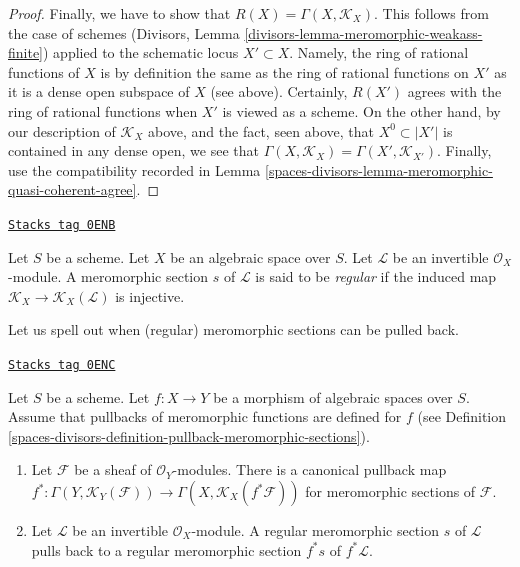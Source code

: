 \begin{proof}
\medskip\noindent
Finally, we have to show that $R(X) = \Gamma(X, \mathcal{K}_X)$.
This follows from the case of schemes
(Divisors, Lemma \ref{divisors-lemma-meromorphic-weakass-finite})
applied to the schematic locus $X' \subset X$.
Namely, the ring of rational functions of $X$ is by definition
the same as the ring of rational functions on $X'$
as it is a dense open subspace of $X$ (see above).
Certainly, $R(X')$ agrees with the ring of rational functions
when $X'$ is viewed as a scheme.
On the other hand, by our description of $\mathcal{K}_X$ above,
and the fact, seen above, that $X^0 \subset |X'|$
is contained in any dense open, we see that
$\Gamma(X, \mathcal{K}_X) = \Gamma(X', \mathcal{K}_{X'})$.
Finally, use the compatibility recorded in
Lemma \ref{spaces-divisors-lemma-meromorphic-quasi-coherent-agree}.
\end{proof}

\begin{definition}
\label{spaces-divisors-definition-regular-meromorphic-section}
\href{https://stacks.math.columbia.edu/tag/0ENB}{\texttt{Stacks tag 0ENB}}

Let $S$ be a scheme.
Let $X$ be an algebraic space over $S$.
Let $\mathcal{L}$ be an invertible $\mathcal{O}_X$-module.
A meromorphic section $s$ of $\mathcal{L}$ is said to be {\it regular}
if the induced map $\mathcal{K}_X \to \mathcal{K}_X(\mathcal{L})$
is injective.
\end{definition}

Let us spell out when (regular) meromorphic sections can be pulled back.

\begin{lemma}
\label{spaces-divisors-lemma-meromorphic-sections-pullback}
\href{https://stacks.math.columbia.edu/tag/0ENC}{\texttt{Stacks tag 0ENC}}

Let $S$ be a scheme.
Let $f : X \to Y$ be a morphism of algebraic spaces over $S$.
Assume that pullbacks of meromorphic functions are defined
for $f$ (see
Definition \ref{spaces-divisors-definition-pullback-meromorphic-sections}).
\begin{enumerate}
\item Let $\mathcal{F}$ be a sheaf of $\mathcal{O}_Y$-modules.
There is a canonical pullback map
$f^* : \Gamma(Y, \mathcal{K}_Y(\mathcal{F})) \to
\Gamma(X, \mathcal{K}_X(f^*\mathcal{F}))$
for meromorphic sections of $\mathcal{F}$.
\item Let $\mathcal{L}$ be an invertible $\mathcal{O}_X$-module.
A regular meromorphic section $s$ of $\mathcal{L}$ pulls back
to a regular meromorphic section $f^*s$ of $f^*\mathcal{L}$.
\end{enumerate}
\end{lemma}

